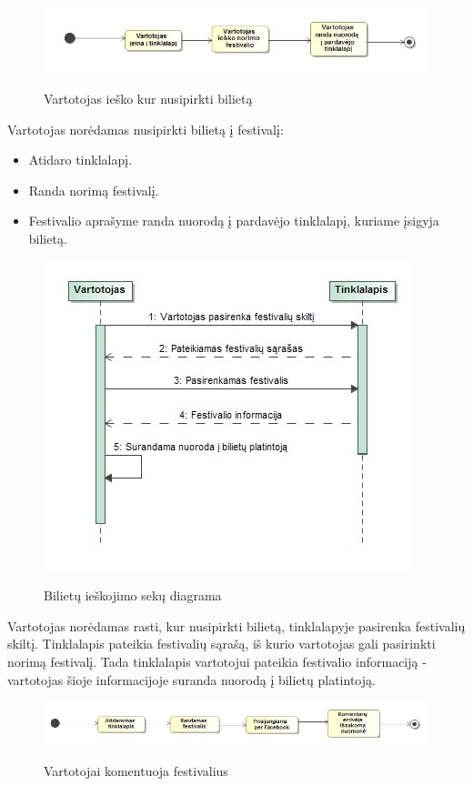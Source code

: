 \documentclass{VUMIFPSkursinis}
\begin{document}
\begin{figure}[H]
    \centering
    \includegraphics[scale=0.6]{img/geri/klientasBilietas}
    \label{img:uml5}
	\caption{Vartotojas ieško kur nusipirkti bilietą}
\end{figure}

Vartotojas norėdamas nusipirkti bilietą į festivalį:
\begin{itemize}
\item Atidaro tinklalapį.
\item Randa norimą festivalį.
\item Festivalio aprašyme randa nuorodą į pardavėjo tinklalapį, kuriame įsigyja bilietą.
\end{itemize}

\begin{figure}[H]
    \centering
    \includegraphics[scale=0.7]{img/geri/_klientasBilietas}
    \label{img:uml6}
	\caption{Bilietų ieškojimo sekų diagrama}
\end{figure}

Vartotojas norėdamas rasti, kur nusipirkti bilietą, tinklalapyje pasirenka festivalių skiltį. Tinklalapis pateikia festivalių sąrašą, iš kurio vartotojas gali pasirinkti norimą festivalį. Tada tinklalapis vartotojui pateikia festivalio informaciją - vartotojas šioje informacijoje suranda nuorodą į bilietų platintoją.

\begin{figure}[H]
    \centering
    \includegraphics[scale=0.5]{img/geri/klientasmintis}
    \label{img:uml7}
	\caption{Vartotojai komentuoja festivalius}
\end{figure}
\end{document}
